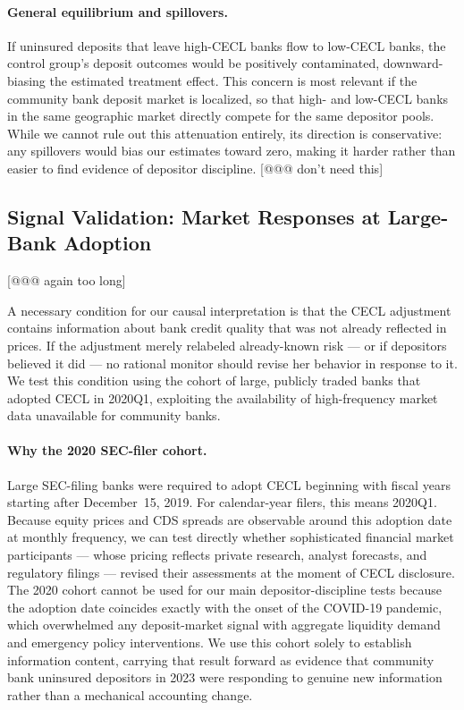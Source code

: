 \paragraph{General equilibrium and spillovers.}
If uninsured deposits that leave high-CECL banks flow to low-CECL banks, the
control group's deposit outcomes would be positively contaminated, downward-biasing
the estimated treatment effect.  This concern is most relevant if the community
bank deposit market is localized, so that high- and low-CECL banks in the same
geographic market directly compete for the same depositor pools.  While we
cannot rule out this attenuation entirely, its direction is conservative: any
spillovers would bias our estimates toward zero, making it harder rather than
easier to find evidence of depositor discipline. [@@@ don't need this]

\subsection{Signal Validation: Market Responses at Large-Bank Adoption} [@@@ again too long]
\label{sec:identification:signal}

A necessary condition for our causal interpretation is that the CECL adjustment
contains information about bank credit quality that was not already reflected
in prices.  If the adjustment merely relabeled already-known risk --- or if
depositors believed it did --- no rational monitor should revise her behavior
in response to it.  We test this condition using the cohort of large, publicly
traded banks that adopted CECL in 2020Q1, exploiting the availability of
high-frequency market data unavailable for community banks.

\paragraph{Why the 2020 SEC-filer cohort.}
Large SEC-filing banks were required to adopt CECL beginning with fiscal years
starting after December~15, 2019.  For calendar-year filers, this means
2020Q1.  Because equity prices and CDS spreads are observable around this
adoption date at monthly frequency, we can test directly whether sophisticated
financial market participants --- whose pricing reflects private research,
analyst forecasts, and regulatory filings --- revised their assessments at the
moment of CECL disclosure.  The 2020 cohort cannot be used for our main
depositor-discipline tests because the adoption date coincides exactly with
the onset of the COVID-19 pandemic, which overwhelmed any deposit-market
signal with aggregate liquidity demand and emergency policy interventions.
We use this cohort solely to establish information content, carrying that
result forward as evidence that community bank uninsured depositors in 2023
were responding to genuine new information rather than a mechanical accounting
change.


